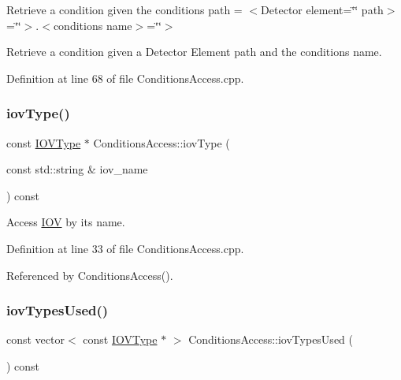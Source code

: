 Retrieve a condition given the conditions path = $<$\+Detector element=\char`\"{}\char`\"{} path$>$=\char`\"{}\char`\"{}$>$.$<$conditions name$>$=\char`\"{}\char`\"{}$>$ 

Retrieve a condition given a Detector Element path and the conditions name. 

Definition at line 68 of file Conditions\+Access.\+cpp.

\hypertarget{class_d_d4hep_1_1_conditions_1_1_conditions_access_a47adb812dd047300b7b69b6544007397}{}\label{class_d_d4hep_1_1_conditions_1_1_conditions_access_a47adb812dd047300b7b69b6544007397} 
\subsubsection{\texorpdfstring{iov\+Type()}{iovType()}}
{\footnotesize\ttfamily const \hyperlink{class_d_d4hep_1_1_i_o_v_type}{I\+O\+V\+Type} $\ast$ Conditions\+Access\+::iov\+Type (\begin{DoxyParamCaption}\item[{const std\+::string \&}]{iov\+\_\+name }\end{DoxyParamCaption}) const}



Access \hyperlink{class_d_d4hep_1_1_i_o_v}{I\+OV} by its name. 



Definition at line 33 of file Conditions\+Access.\+cpp.



Referenced by Conditions\+Access().

\hypertarget{class_d_d4hep_1_1_conditions_1_1_conditions_access_a8d22f883fc827ab82631a0a00bcc2c88}{}\label{class_d_d4hep_1_1_conditions_1_1_conditions_access_a8d22f883fc827ab82631a0a00bcc2c88} 
\subsubsection{\texorpdfstring{iov\+Types\+Used()}{iovTypesUsed()}}
{\footnotesize\ttfamily const vector$<$ const \hyperlink{class_d_d4hep_1_1_i_o_v_type}{I\+O\+V\+Type} $\ast$ $>$ Conditions\+Access\+::iov\+Types\+Used (\begin{DoxyParamCaption}{ }\end{DoxyParamCaption}) const}



